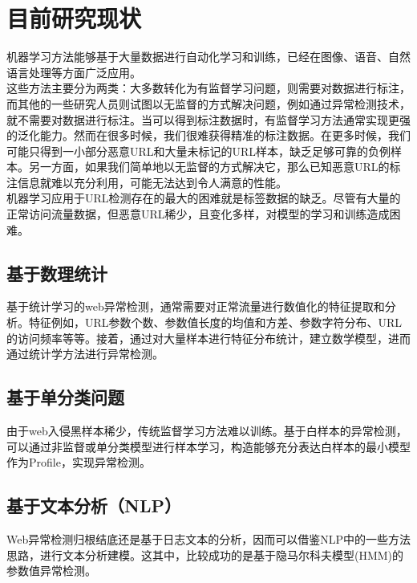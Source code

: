 \section{目前研究现状}
机器学习方法能够基于大量数据进行自动化学习和训练，已经在图像、语音、自然语言处理等方面广泛应用。
\\\indent{}这些方法主要分为两类：大多数转化为有监督学习问题，则需要对数据进行标注，而其他的一些研究人员则试图以无监督的方式解决问题，例如通过异常检测技术，就不需要对数据进行标注。当可以得到标注数据时，有监督学习方法通常实现更强的泛化能力。然而在很多时候，我们很难获得精准的标注数据。在更多时候，我们可能只得到一小部分恶意URL和大量未标记的URL样本，缺乏足够可靠的负例样本。另一方面，如果我们简单地以无监督的方式解决它，那么已知恶意URL的标注信息就难以充分利用，可能无法达到令人满意的性能。
\\\indent{}机器学习应用于URL检测存在的最大的困难就是标签数据的缺乏。尽管有大量的正常访问流量数据，但恶意URL稀少，且变化多样，对模型的学习和训练造成困难。
\subsection{基于数理统计}
基于统计学习的web异常检测，通常需要对正常流量进行数值化的特征提取和分析。特征例如，URL参数个数、参数值长度的均值和方差、参数字符分布、URL的访问频率等等。接着，通过对大量样本进行特征分布统计，建立数学模型，进而通过统计学方法进行异常检测。
\subsection{基于单分类问题}
由于web入侵黑样本稀少，传统监督学习方法难以训练。基于白样本的异常检测，可以通过非监督或单分类模型进行样本学习，构造能够充分表达白样本的最小模型作为Profile，实现异常检测。
\subsection{基于文本分析（NLP）}
Web异常检测归根结底还是基于日志文本的分析，因而可以借鉴NLP中的一些方法思路，进行文本分析建模。这其中，比较成功的是基于隐马尔科夫模型(HMM)的参数值异常检测。